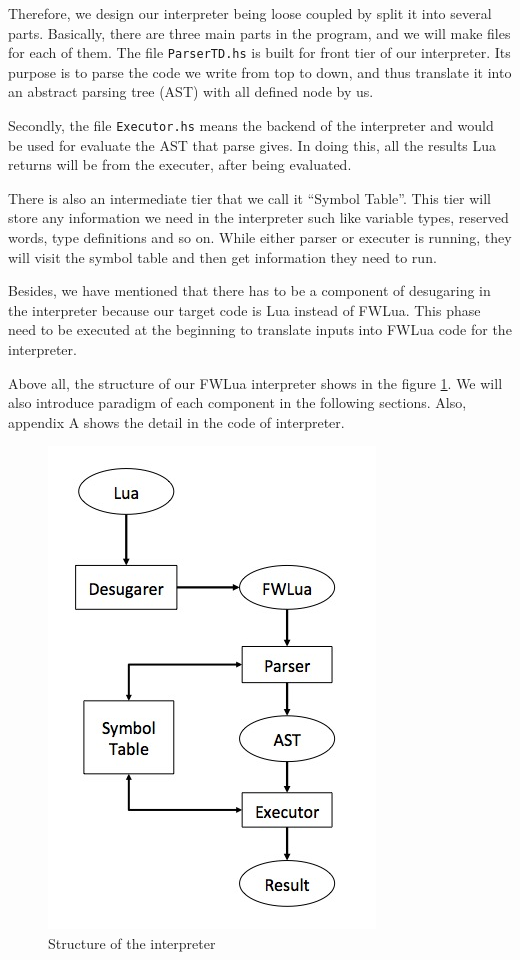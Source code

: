 Therefore, we design our interpreter being loose coupled by split it into several parts. Basically, there are three main parts in the program, and we will make files for each of them. The file {\tt ParserTD.hs} is built for front tier of our interpreter. Its purpose is to parse the code we write from top to down, and thus translate it into an abstract parsing tree (AST) with all defined node by us. 

Secondly, the file {\tt Executor.hs} means the backend of the interpreter and would be used for evaluate the AST that parse gives. In doing this, all the results Lua returns will be from the executer, after being evaluated. 

There is also an intermediate tier that we call it ``Symbol Table''. This tier will store any information we need in the interpreter such like variable types, reserved words, type definitions and so on. While either parser or executer is running, they will visit the symbol table and then get information they need to run. 

Besides, we have mentioned that there has to be a component of desugaring in the interpreter because our target code is Lua instead of FWLua. This phase need to be executed at the beginning to translate inputs into FWLua code for the interpreter. 

Above all, the structure of our FWLua interpreter shows in the figure \ref {fig:structure}. We will also introduce paradigm of each component in the following sections. Also, appendix A shows the detail in the code of interpreter.
\begin{figure}
\centering
\caption{Structure of the interpreter}
\label{fig:structure}
\includegraphics[scale = 0.9]{Interpreter}
\end{figure}
